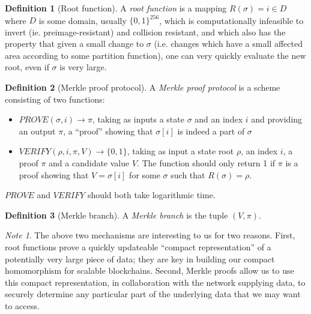 \documentclass[11pt,a4paper]{article}
\makeatletter
\theoremstyle{plain}
\theoremstyle{definition}
\newtheorem{defn}{Definition}[section]
\theoremstyle{remark}
\newtheorem*{note}{Note}
\newcommand{\ie}{i.e.\@\xspace}
\makeatother
\begin{document}
\begin{defn}[Root function]
A \emph{root function} is a mapping $R(\sigma) = i \in D$ where $D$ is some domain, usually $\{0,1\}^{256}$, which is computationally infeasible to invert (ie. preimage-resistant) and collision resistant, and which also has the property that given a small change to $\sigma$ (\ie changes which have a small affected area according to some partition function), one can very quickly evaluate the new root, even if $\sigma$ is very large.
\end{defn}

\begin{defn}[Merkle proof protocol]
A \emph{Merkle proof protocol} is a scheme consisting of two functions:
\begin{itemize}
\item
$PROVE(\sigma, i) \rightarrow \pi$, taking as inputs a state $\sigma$ and an index $i$ and providing an output $\pi$, a ``proof'' showing that $\sigma[i]$ is indeed a part of $\sigma$
\item
$VERIFY(\rho, i, \pi, V) \rightarrow \{0, 1\}$, taking as input a state root $\rho$, an index $i$, a proof $\pi$ and a candidate value $V$. The function should only return 1 if $\pi$ is a proof showing that $V = \sigma[i]$ for some $\sigma$ such that $R(\sigma) = \rho$.
\end{itemize}
$PROVE$ and $VERIFY$ should both take logarithmic time.
\end{defn}

\begin{defn}[Merkle branch]
A \emph{Merkle branch} is the tuple $(V, \pi)$.
\end{defn}

\begin{note}
The above two mechanisms are interesting to us for two reasons. First, root functions prove a quickly updateable ``compact representation'' of a potentially very large piece of data; they are key in building our compact homomorphism for scalable blockchains. Second, Merkle proofs allow us to use this compact representation, in collaboration with the network supplying data, to securely determine any particular part of the underlying data that we may want to access.
\end{note}
\end{document}
